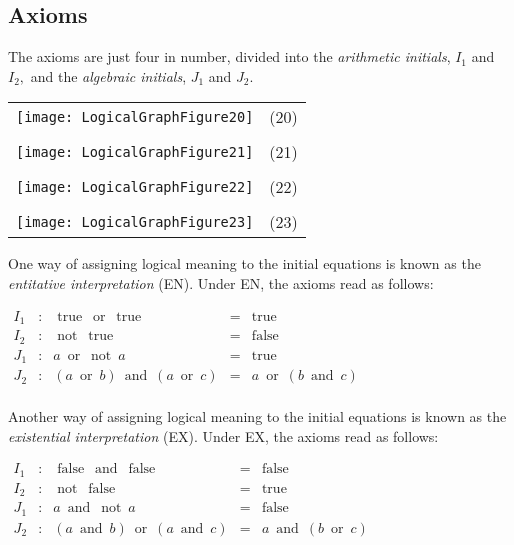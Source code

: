 \documentclass[12pt]{article}
\begin{document}
\subsection{Axioms}

The axioms are just four in number, divided into the \textit{arithmetic initials}, $I_1$ and $I_2,$ and the \textit{algebraic initials}, $J_1$ and $J_2.$

\begin{center}\begin{tabular}{cc}
\texttt{[image: LogicalGraphFigure20]} & (20)
\\\\
\texttt{[image: LogicalGraphFigure21]} & (21)
\\\\
\texttt{[image: LogicalGraphFigure22]} & (22)
\\\\
\texttt{[image: LogicalGraphFigure23]} & (23)
\end{tabular}\end{center}

One way of assigning logical meaning to the initial equations is known as the \textit{entitative interpretation} (EN).  Under EN, the axioms read as follows:

\begin{center}$\begin{array}{ccccc}
I_1 & : &
\operatorname{true}\ \operatorname{or}\ \operatorname{true} & = &
\operatorname{true}  \\
I_2 & : &
\operatorname{not}\ \operatorname{true}\ & = &
\operatorname{false} \\
J_1 & : &
a\ \operatorname{or}\ \operatorname{not}\ a & = &
\operatorname{true}  \\
J_2 & : &
(a\ \operatorname{or}\ b)\ \operatorname{and}\ (a\ \operatorname{or}\ c) & = &
a\ \operatorname{or}\ (b\ \operatorname{and}\ c) \\
\end{array}$\end{center}

Another way of assigning logical meaning to the initial equations is known as the \textit{existential interpretation} (EX).  Under EX, the axioms read as follows:

\begin{center}$\begin{array}{ccccc}
I_1 & : &
\operatorname{false}\ \operatorname{and}\ \operatorname{false} & = &
\operatorname{false} \\
I_2 & : &
\operatorname{not}\ \operatorname{false} & = &
\operatorname{true}  \\
J_1 & : &
a\ \operatorname{and}\ \operatorname{not}\ a & = &
\operatorname{false} \\
J_2 & : &
(a\ \operatorname{and}\ b)\ \operatorname{or}\ (a\ \operatorname{and}\ c) & = &
a\ \operatorname{and}\ (b\ \operatorname{or}\ c) \\
\end{array}$\end{center}
\end{document}
